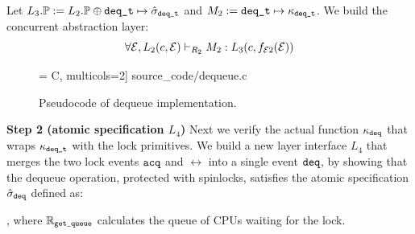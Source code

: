 {Let $L_3.\primt := L_2.\primt \oplus \deq\comm{\_t} \mapsto \spec_{\deq\comm{\_t}}$ 
and
$M_2 :=  \deq\comm{\_t} \mapsto \module_{\deq\comm{\_t}}$.
We build the concurrent abstraction layer:
\[
\forall \oracle, 
\ltyp{L_2(c,\oracle)}{R_2}{M_2}{L_3(c,f_{\oracle 2} (\oracle))}
\]

\begin{figure}[t]
 = C, multicols=2] {source_code/dequeue.c}
\caption{Pseudocode of dequeue implementation.}
\label{fig:exp:dequeue}
\hrulefill
\end{figure}

\noindent\textbf{Step 2 (atomic specification $L_4$)}
Next we verify the actual function $\module_{\deq}$ that wraps
$\module_{\deq\comm{\_t}}$ with the lock primitives.
We build a new layer interface $L_4$ that merges the two lock events
$\acq$ and $\rel$ into a single event $\deq$,
by showing that the dequeue operation, protected with spinlocks,
satisfies the atomic specification $\spec_{\deq}$ defined as:
\begin{mathpar}
\end{mathpar}
, where $\replay_\comm{get\_queue}$
calculates the queue of CPUs waiting for the lock.

}
